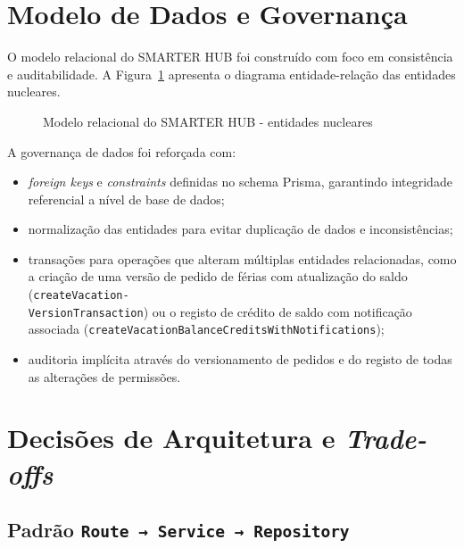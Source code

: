 \documentclass[12pt, a4paper, twoside, openright]{report}
\begin{document}
\section{Modelo de Dados e Governança}

O modelo relacional do SMARTER HUB foi construído com foco em consistência e
auditabilidade. A Figura~\ref{fig:der} apresenta o diagrama entidade-relação
das entidades nucleares.

\begin{figure}[H]
  \centering
  \caption{Modelo relacional do SMARTER HUB - entidades nucleares}
  \label{fig:der}
\end{figure}

A governança de dados foi reforçada com:

\begin{itemize}
  \item \textit{foreign keys} e \textit{constraints} definidas no schema Prisma, garantindo integridade referencial a nível de base de dados;
  \item normalização das entidades para evitar duplicação de dados e inconsistências;
  \item transações para operações que alteram múltiplas entidades relacionadas,
        como a criação de uma versão de pedido de férias com atualização do saldo
        (\texttt{createVacation-\\VersionTransaction}) ou o registo de crédito de
        saldo com notificação associada
        (\texttt{createVacationBalanceCreditsWithNotifications});
  \item auditoria implícita através do versionamento de pedidos e do registo
        de todas as alterações de permissões.
\end{itemize}

\section{Decisões de Arquitetura e \textit{Trade-offs}}

\subsection{Padrão \texttt{Route → Service → Repository}}
\end{document}
